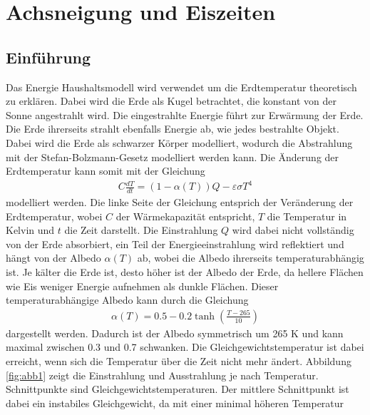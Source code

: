 %
%
%
\chapter{Achsneigung und Eiszeiten\label{chapter:neigung}}
\begin{refsection}

\section{Einführung}\label{sec:einf} 
Das Energie Haushaltsmodell wird verwendet um die Erdtemperatur
theoretisch zu erklären. Dabei wird die Erde als Kugel betrachtet,
die konstant von der Sonne angestrahlt wird. Die eingestrahlte
Energie führt zur Erwärmung der Erde. Die Erde ihrerseits strahlt
ebenfalls Energie ab, wie jedes bestrahlte Objekt. Dabei wird die
Erde als schwarzer Körper modelliert, wodurch die Abstrahlung mit
der Stefan-Bolzmann-Gesetz modelliert werden kann. Die Änderung der
Erdtemperatur kann somit mit der Gleichung
\begin{eqnarray}
\label{eq1}
C \frac{d T}{d t} = (1-\alpha(T)) Q- \varepsilon \sigma T^4
\end{eqnarray}
modelliert werden. Die linke Seite der Gleichung entsprich der
Veränderung der Erdtemperatur, wobei $C$ der Wärmekapazität entspricht,
$T$ die Temperatur in Kelvin und $t$ die Zeit darstellt. Die
Einstrahlung $Q$ wird dabei nicht vollständig von der Erde absorbiert,
ein Teil der Energieeinstrahlung wird reflektiert und hängt von der
Albedo $\alpha(T)$ ab, wobei die Albedo ihrerseits temperaturabhängig
ist. Je kälter die Erde ist, desto höher ist der Albedo der Erde,
da hellere Flächen wie Eis weniger Energie aufnehmen als dunkle
Flächen. Dieser temperaturabhängige Albedo kann durch die Gleichung
\begin{eqnarray} 
\alpha(T) = 0.5 - 0.2 \tanh \left( \frac{T-265}{10} \right) 
\end{eqnarray}
dargestellt werden. Dadurch ist der Albedo symmetrisch um 265 K und
kann maximal zwischen 0.3 und 0.7 schwanken. Die Gleichgewichtstemperatur
ist dabei erreicht, wenn sich die Temperatur über die Zeit nicht
mehr ändert. Abbildung \ref{fig:abb1} zeigt die Einstrahlung und
Ausstrahlung je nach Temperatur. Schnittpunkte sind
Gleichgewichtstemperaturen. Der mittlere Schnittpunkt ist dabei ein
instabiles Gleichgewicht, da mit einer minimal höheren Temperatur

\end{refsection}
